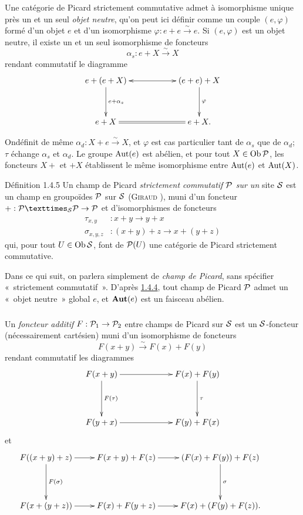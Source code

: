 \documentclass[10pt]{../fichiers-configuration-latex/smfart}
\begin{document}
\setcounter{subsubsection}{3}
\subsubsection{}
Une catégorie de Picard strictement commutative admet à isomorphisme
unique près un et un seul \emph{objet neutre}, qu'on peut ici définir
comme un couple $(e,\varphi)$ formé d'un objet $e$ et d'un
isomorphisme $\varphi:e+e\xrightarrow{\sim}e$. Si $(e,\varphi)$ est un
objet neutre, il existe un et un seul isomorphisme de foncteurs
$$
\alpha_{s}:e+X\xrightarrow{\sim} X
$$
rendant commutatif le diagramme
$$
\xymatrix@C=2cm@R=1.25cm{
e + (e + X) \ar@{<->}[r] \ar[d]^{e+\alpha_s} & (e + e) + X \ar[d]^{\varphi}\\
e + X \ar@{=}[r]                       & e + X .
}
$$

On\pageoriginale définit de même $\alpha_{d}:X+e\xrightarrow{\sim}X$,
et $\varphi$ est cas particulier tant de $\alpha_{s}$ que de
$\alpha_{d}$; $\tau$ échange $\alpha_{s}$ et $\alpha_{d}$. Le groupe
$\operatorname{Aut}(e)$ est abélien, et pour tout $X\in \operatorname{Ob}{\mathcal P}$, les
foncteurs $X+$ et $+X$ établissent le même isomorphisme entre $\operatorname{Aut}(e)$ et
$\operatorname{Aut}(X)$.

\begin{enonce*}{Définition 1.4.5}
Un champ de Picard \emph{strictement commutatif ${\mathcal P}$ sur un}
site ${\mathcal S}$ est un champ en groupoïdes ${\mathcal P}$ sur
${\mathcal S}$ (\textsc{Giraud} \cite{SGA4-18:1}), muni d'un foncteur
$+:\fprod{\Pp}{\Pp}{\Ss}\rightarrow \Pp$ et
d'isomorphismes de foncteurs
\begin{align*}
\tau_{x,y} &: x+y\longrightarrow y+x\\
\sigma_{x,y,z} &: (x+y)+z\longrightarrow x+(y+z)
\end{align*}
qui, pour tout $U\in \operatorname{Ob} {\mathcal S}$, font de ${\mathcal P}(U)$ une
catégorie de Picard strictement commutative.
\end{enonce*}

Dans ce qui suit, on parlera simplement de \emph{champ de Picard},
sans spécifier « strictement commutatif ». D'après
\hyperref[XVIII.subsubsec1.4.4]{1.4.4}, tout 
champ de Picard ${\mathcal P}$ admet un « objet neutre »  global
$e$, et $\operatorname{\mathbf{Aut}}(e)$ est un faisceau abélien.

\setcounter{subsubsection}{5}
\subsubsection{}
Un \emph{foncteur additif} $F:{\mathcal P}_{1}\rightarrow
{\mathcal P}_{2}$ entre champs de Picard sur ${\mathcal S}$ est un
${\mathcal S}$-foncteur (nécessairement cartésien) muni d'un
isomorphisme de foncteurs
$$
F(x+y)\xrightarrow{\sim} F(x)+F(y)
$$
rendant commutatif les diagrammes
$$
\xymatrix@C=2.25cm@R=1.5cm{
F(x+y)  \ar[r] \ar[d]^{F(\tau)}& F(x) + F(y) \ar[d]^{\tau}\\
F(y+x)         \ar[r] & F(y) + F(x)
}
$$
et
$$
\xymatrix@R=1.5cm{
  F((x+y)+z) \ar[r]\ar[d]^{F(\sigma)} & F(x+y)+F(z) \ar[r]&(F(x) + F(y)) + F(z)       \ar[d]^{\sigma}  &
\\
F(x + (y + z))    \ar[r]        & F(x) + F(y +z)  \ar[r] & F(x) + (F(y)
+ F(z)). 
}
$$
\end{document}
